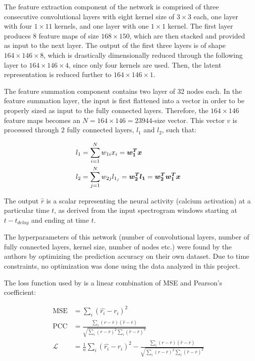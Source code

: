 The feature extraction component of the network is comprised of three consecutive convolutional layers with eight kernel size of $3 \times 3$ each, one layer with four $1 \times 1 1$ kernels, and one layer with one $1 \times 1$ kernel. The first layer produces 8 feature maps of size $168 \times 150$, which are then stacked and provided as input to the next layer. The output of the first three layers is of shape $164 \times 146 \times 8$, which is drastically dimensionally reduced through the following layer to $164 \times 146 \times 4$, since only four kernels are used. Then, the latent representation is reduced further to $164 \times 146 \times 1$.

The feature summation component contains two layer of 32 nodes each. In the feature summation layer, the input is first flattened into a vector in order to be properly sized as input to the fully connected layers. Therefore, the $164 \times 146$ feature maps becomes an $N = 164 \times 146 = 23944$-size vector. This vector $v$ is processed through 2 fully connected layers, $l_1$ and $l_2$, such that:

\begin{align*}
	l_1 &= \sum_{i=1}^N w_{1i} x_i = \bm{w_1^T}\bm{x} \\
	l_2 &= \sum_{j=1}^N w_{2j} l_{1_j} = \bm{w_2^T}\bm{l_1} = \bm{w_2^T}\bm{w_1^T}\bm{x}
\end{align*}


The output $\hat{r}$ is a scalar representing the neural activity (calcium activation) at a particular time $t$, as derived from the input spectrogram windows starting at $t - t_{delay}$ and ending at time $t$.

The hyperparameters of this network (number of convolutional layers, number of fully connected layers, kernel size, number of nodes etc.) were found by the authors by optimizing the prediction accuracy on their own dataset. Due to time constraints, no optimization was done using the data analyzed in this project.

The loss function used by \parencite{keshishianEstimatingInterpretingNonlinear2020} is a linear combination of MSE and Pearson's coefficient:

\begin{align}
	\mathrm{MSE} &= \sum_i (\hat{r_i} -r_i)^2 \\
	\mathrm{PCC} &= \frac{\sum _i (r - \overline{r}) (\hat{r} - \overline{r})}{\sqrt{\sum _i (r - \overline{r})^2 \sum _i (\hat{r} - \overline{r})^2}} \\
	\mathcal{L} &= \frac{1}{n} \sum_i (\hat{r_i} -r_i)^2 - \frac{\sum _i (r - \overline{r}) (\hat{r} - \overline{r})}{\sqrt{\sum _i (r - \overline{r})^2 \sum _i (\hat{r} - \overline{r})^2}}
\end{align}

